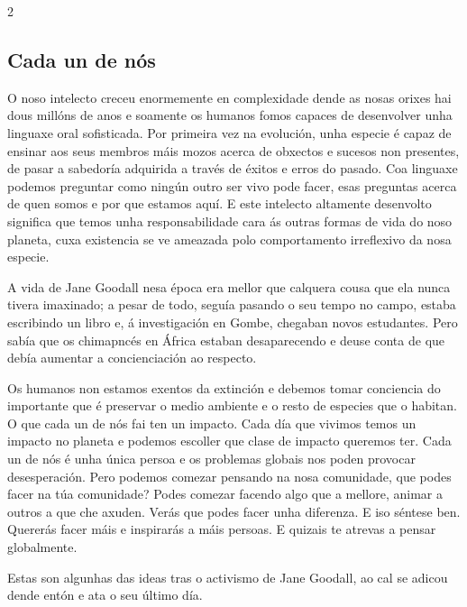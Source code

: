 \begin{multicols}{2}
\subsection*{Cada un de nós}

O noso intelecto creceu enormemente en complexidade dende as nosas orixes hai
dous millóns de anos e soamente os humanos fomos capaces de desenvolver unha
linguaxe oral sofisticada. Por primeira vez na evolución, unha especie é capaz
de ensinar aos seus membros máis mozos acerca de obxectos e sucesos non
presentes, de pasar a sabedoría adquirida a través de éxitos e erros do pasado.
Coa linguaxe podemos preguntar como ningún outro ser vivo pode facer, esas
preguntas acerca de quen somos e por que estamos aquí. E este intelecto
altamente desenvolto significa que temos unha responsabilidade cara ás outras
formas de vida do noso planeta, cuxa existencia se ve ameazada polo
comportamento irreflexivo da nosa especie.

A vida de Jane Goodall nesa época era mellor que calquera cousa que ela nunca
tivera imaxinado; a pesar de todo, seguía pasando o seu tempo no campo, estaba
escribindo un libro e, á investigación en Gombe, chegaban novos estudantes.
Pero sabía que os chimapncés en África estaban desaparecendo e deuse conta de
que debía aumentar a concienciación ao respecto.

Os humanos non estamos exentos da extinción e debemos tomar conciencia do
importante que é preservar o medio ambiente e o resto de especies que o
habitan. O que cada un de nós fai ten un impacto. Cada día que vivimos temos un
impacto no planeta e podemos escoller que clase de impacto queremos ter. Cada
un de nós é unha única persoa e os problemas globais nos poden provocar
desesperación. Pero podemos comezar pensando na nosa comunidade, que podes
facer na túa comunidade? Podes comezar facendo algo que a mellore, animar a
outros a que che axuden. Verás que podes facer unha diferenza. E iso séntese
ben. Quererás facer máis e inspirarás a máis persoas. E quizais te atrevas a
pensar globalmente.

Estas son algunhas das ideas tras o activismo de Jane Goodall, ao cal se adicou
dende entón e ata o seu último día.



\end{multicols}
